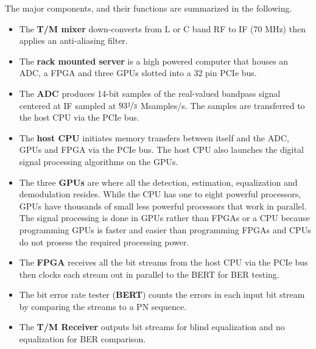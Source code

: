 The major components, and their functions are summarized in the following.
\begin{itemize}
	\item The \textbf{T/M mixer} down-converts from L or C band RF to IF (70 MHz) then applies an anti-aliasing filter.
	\item The \textbf{rack mounted server} is a high powered computer that houses an ADC, a FPGA and three GPUs 		slotted into a 32 pin PCIe bus.
	\item The \textbf{ADC} produces 14-bit samples of the real-valued bandpass signal
	centered at IF sampled at $93\nicefrac{1}{3}$ Msamples/s.
	The samples are transferred to the host CPU via the PCIe bus.
	\item The \textbf{host CPU} initiates memory transfers between itself and the ADC, GPUs and FPGA via the PCIe 	bus. 
	The host CPU also launches the digital signal processing algorithms on the GPUs.
	\item The three \textbf{GPUs} are where all the detection, estimation, equalization and demodulation resides.
While the CPU has one to eight powerful processors, GPUs have thousands of small less powerful processors that work in parallel. The signal processing is done in GPUs rather than FPGAs or a CPU because programming GPUs is faster and easier than programming FPGAs and CPUs do not prosess the required processing power.
	\item The \textbf{FPGA} receives all the bit streams from the host CPU via the PCIe bus then clocks each 			stream out in parallel to the BERT for BER testing.
	\item The bit error rate tester (\textbf{BERT}) counts the errors in each input bit stream by comparing the 		streams to a PN sequence.
	\item The \textbf{T/M Receiver} outputs bit streams for blind equalization and no equalization for 					BER comparison.
\end{itemize}

